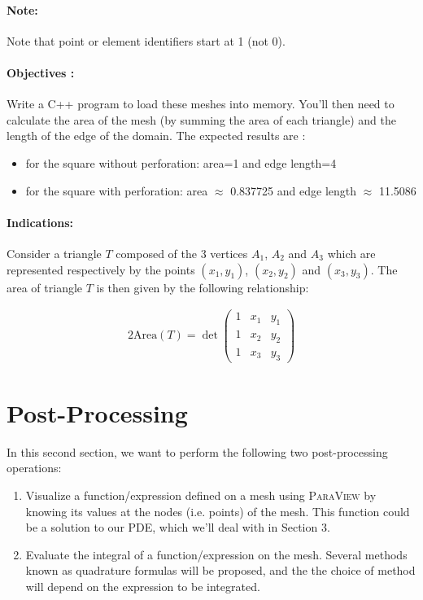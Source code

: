 \documentclass[english,10pt,a4paper]{article}
\begin{document}
\paragraph{Note:} Note that point or element identifiers start at 1 (not 0).

\paragraph{Objectives :}
Write a C++ program to load these meshes into memory. You'll then need to calculate the area of the mesh (by summing the area of each triangle) and the length of the edge of the domain.
The expected results are :
\begin{itemize}
\item for the square without perforation: area=1 and edge length=4
\item for the square with perforation: area $\approx$ 0.837725 and edge length $\approx$ 11.5086
\end{itemize}


\paragraph{Indications:}
Consider a triangle $T$ composed of the 3 vertices $A_1$, $A_2$ and $A_3$ which are represented respectively by the points $(x_1,y_1)$, $(x_2,y_2)$ and $(x_3,y_3)$.
The area of triangle $T$ is then given by the following relationship:

\begin{eqnarray*}
2 \mathrm{Area}(T) = \det \left(
  \begin{matrix}
    1 & x_1 & y_1 \\
    1 & x_2 & y_2 \\
    1 & x_3 & y_3
  \end{matrix}
  \right)
\end{eqnarray*}




\section{Post-Processing}

In this second section, we want to perform the following two post-processing operations:
\begin{enumerate}
\item Visualize a function/expression defined on a mesh using \textsc{ParaView} by knowing its values at the nodes (i.e. points) of the mesh.
  This function could be a solution to our PDE, which we'll deal with in Section 3.
\item Evaluate the integral of a function/expression on the mesh. Several methods known as quadrature formulas will be proposed, and the
  the choice of method will depend on the expression to be integrated.
\end{enumerate}
\end{document}
